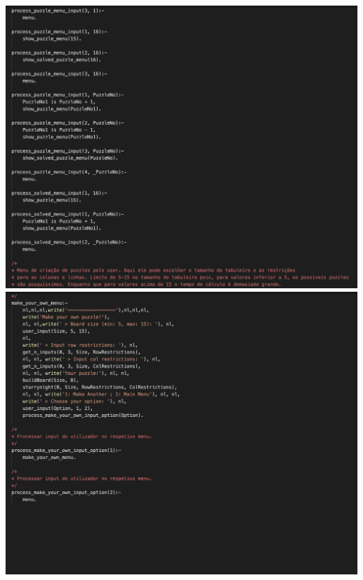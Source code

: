 \documentclass[a4paper]{article}
\begin{document}
\begin{center}
    \includegraphics[scale=0.4]{img/16.png}
    \includegraphics[scale=0.4]{img/17.png}
\end{center}
\end{document}
